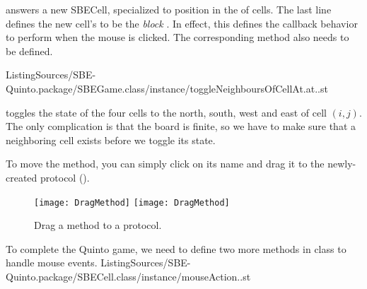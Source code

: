 \documentclass[a4paper,10pt,twoside]{book}
\begin{document}
 answers a new SBECell, specialized to position  in the  of cells.
The last line defines the new cell's  to be the \emph{block}
\mbox{.}
In effect, this defines the callback behavior to perform when the mouse is clicked.
The corresponding method also needs to be defined.

%
{ListingSources/SBE-Quinto.package/SBEGame.class/instance/toggleNeighboursOfCellAt.at..st}

 toggles the state of the four cells to the north, south, west and east of cell $(i, j)$.
The only complication is that the board is finite, so we have to make sure that a neighboring cell exists before we toggle its state.

To move the method, you can simply click on its name and drag it to the newly-created protocol ().

\begin{figure}[htbp]
   \centering
   \ifluluelse
		{\texttt{[image: DragMethod]} }
		{\texttt{[image: DragMethod]} }
   \caption{Drag a method to a protocol.\label{fig:dragMethod}}
\end{figure}

To complete the Quinto game, we need to define two more methods in class  to handle mouse events.
%
{ListingSources/SBE-Quinto.package/SBECell.class/instance/mouseAction..st}
\end{document}
